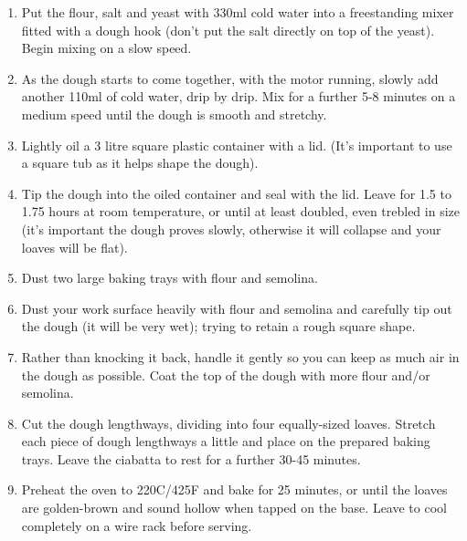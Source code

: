 \documentclass[12pt]{article}
\begin{document}
\begin{multicols*}{2}
\begin{enumerate}
    \item Put the flour, salt and yeast with 330ml cold water into a freestanding mixer fitted with a dough hook (don’t put the salt directly on top of the yeast). Begin mixing on a slow speed.
    \item As the dough starts to come together, with the motor running, slowly add another 110ml of cold water, drip by drip. Mix for a further 5-8 minutes on a medium speed until the dough is smooth and stretchy.
    \item Lightly oil a 3 litre square plastic container with a lid. (It’s important to use a square tub as it helps shape the dough).
    \item Tip the dough into the oiled container and seal with the lid. Leave for 1.5 to 1.75 hours at room temperature, or until at least doubled, even trebled in size (it's important the dough proves slowly, otherwise it will collapse and your loaves will be flat).
    \item Dust two large baking trays with flour and semolina.
    \item Dust your work surface heavily with flour and semolina and carefully tip out the dough (it will be very wet); trying to retain a rough square shape.
    \item Rather than knocking it back, handle it gently so you can keep as much air in the dough as possible. Coat the top of the dough with more flour and/or semolina.
    \item Cut the dough lengthways, dividing into four equally-sized loaves. Stretch each piece of dough lengthways a little and place on the prepared baking trays. Leave the ciabatta to rest for a further 30-45 minutes.
    \item Preheat the oven to 220C/425F and bake for 25 minutes, or until the loaves are golden-brown and sound hollow when tapped on the base. Leave to cool completely on a wire rack before serving.
\end{enumerate}

\end{multicols*}
\end{document}
